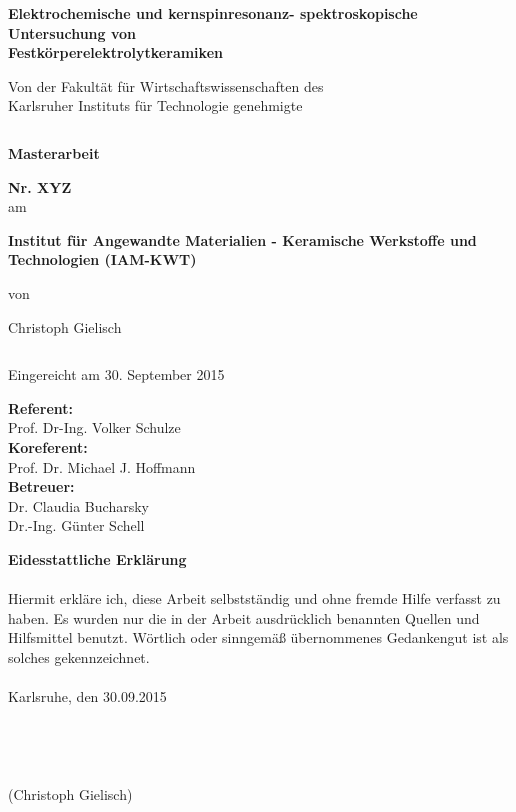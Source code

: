 \documentclass[a4paper, 11pt, headsepline,footsepline,twoside,abstract]{scrbook}
\begin{document}
\begin{center}
\textbf{\huge{ Elektrochemische und kern\-spin\-resonanz- spek\-tros\-ko\-pische Untersuchung von\\[0.4cm]Festkörperelektrolytkeramiken}}
\end{center}
\begin{center}
\textbf{\Large{}}
\end{center}
\begin{center}
\large{Von der Fakultät für Wirtschaftswissenschaften des \\ Karlsruher Instituts für Technologie genehmigte }
\end{center}
\begin{verbatim}

\end{verbatim}
\begin{center}
\textbf{\LARGE{Masterarbeit}}
\end{center}
\begin{center}
\textbf{\Large{Nr. XYZ}}\\
am
\end{center}
\begin{center}
\textbf{\Large{Institut für Angewandte Materialien - Keramische Werkstoffe und Technologien (IAM-KWT)}}
\end{center}
\begin{center}
von
\end{center}
\begin{center}
\Large{Christoph Gielisch}
\end{center}
\begin{verbatim}
\end{verbatim}
\begin{center}
Eingereicht am 30. September 2015
\end{center}
\begin{center}
\textbf{Referent:} \\ Prof. Dr-Ing. Volker Schulze \\
\textbf{Koreferent:} \\ Prof. Dr. Michael J. Hoffmann\\
\textbf{Betreuer:} \\ Dr. Claudia Bucharsky \\ 
Dr.-Ing. Günter Schell \\
\end{center}
\newpage
\cleardoubleemptypage
\setcounter{page}{1}
\textbf{\Large{Eidesstattliche Erklärung}}
\\\\
Hiermit erkläre ich, diese Arbeit selbstständig und ohne fremde Hilfe verfasst zu haben. Es wurden nur die in der Arbeit ausdrücklich benannten Quellen und Hilfsmittel benutzt. Wörtlich oder sinngemäß übernommenes Gedankengut ist als solches gekennzeichnet.
\\\\
Karlsruhe, den 30.09.2015
\\\\
\\\\
\\
(Christoph Gielisch) 
 
\end{document}
